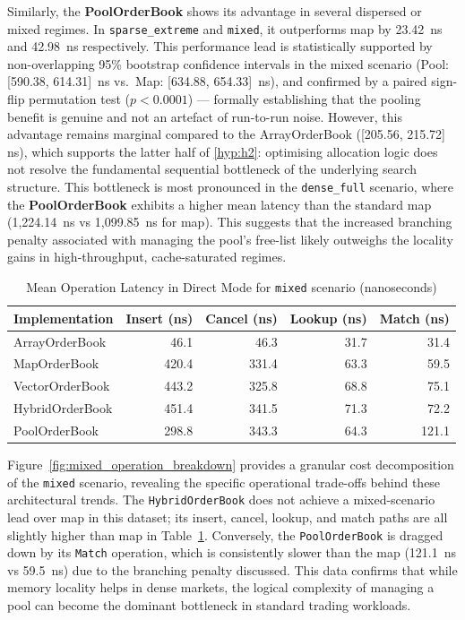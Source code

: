 Similarly, the \textbf{PoolOrderBook} shows its advantage in several dispersed
or mixed regimes. In \texttt{sparse\_extreme} and \texttt{mixed},
it outperforms map by 23.42~ns and 42.98~ns respectively. 
This performance lead is statistically supported by non-overlapping 95\% 
bootstrap confidence intervals in the mixed scenario (Pool: [590.38, 614.31]~ns 
vs.\ Map: [634.88, 654.33]~ns), and confirmed by a paired sign-flip permutation 
test ($p<0.0001$) --- formally establishing that the pooling benefit is genuine 
and not an artefact of run-to-run noise. However, 
this advantage remains marginal compared to the ArrayOrderBook 
([205.56, 215.72] ns), which supports the latter half of \ref{hyp:h2}: 
optimising allocation logic does not resolve the fundamental 
sequential bottleneck of the underlying search structure. This bottleneck 
is most pronounced in the \texttt{dense\_full} scenario, where the 
\textbf{PoolOrderBook} exhibits a higher mean latency than the standard map 
(1,224.14~ns vs 1,099.85~ns for map). This suggests that the increased 
branching penalty associated with managing the pool's free-list likely 
outweighs the locality gains in high-throughput, cache-saturated regimes.


\begin{table}[htbp]
    \centering
    \small
    \begin{tabular}{lrrrr}
        \toprule
        \textbf{Implementation} & \textbf{Insert (ns)} & \textbf{Cancel (ns)} & \textbf{Lookup (ns)} & \textbf{Match (ns)} \\
        \midrule
        ArrayOrderBook   & 46.1 & 46.3 & 31.7 & 31.4 \\
        MapOrderBook     & 420.4 & 331.4 & 63.3 & 59.5 \\
        VectorOrderBook  & 443.2 & 325.8 & 68.8 & 75.1 \\
        HybridOrderBook  & 451.4 & 341.5 & 71.3 & 72.2 \\
        PoolOrderBook    & 298.8 & 343.3 & 64.3 & 121.1 \\
        \bottomrule
    \end{tabular}
    \caption{Mean Operation Latency in Direct Mode for \texttt{mixed} scenario (nanoseconds)}
    \label{tab:direct_mean_latency}
\end{table}

Figure~\ref{fig:mixed_operation_breakdown} provides a granular cost 
decomposition of the \texttt{mixed} scenario, revealing the specific 
operational trade-offs behind these architectural trends. The 
\texttt{HybridOrderBook} does not achieve a mixed-scenario lead over map in
this dataset; its insert, cancel, lookup, and match paths are all slightly
higher than map in Table~\ref{tab:direct_mean_latency}. Conversely, the 
\texttt{PoolOrderBook} is dragged down by its \texttt{Match} operation, which 
is consistently slower than the map (121.1~ns vs 59.5~ns) due to the branching 
penalty discussed. This data confirms that while memory locality helps in 
dense markets, the logical complexity of managing a pool can become the 
dominant bottleneck in standard trading workloads.


